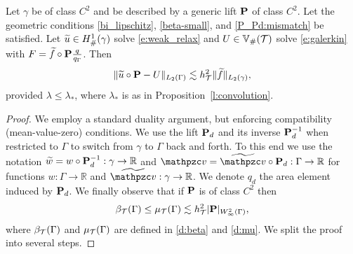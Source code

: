 \begin{theorem}\label{t:L2_apriori}
Let $\gamma$ be of class $C^2$ and be described by a generic lift  ${\bf P}$ of class
$C^2$. Let the geometric conditions \eqref{bi_lipschitz},
\eqref{beta-small}, and \eqref{P_Pd:mismatch} be satisfied.
%
Let $\widetilde{u}\in H^1_\#(\gamma)$ solve \eqref{e:weak_relax} and $U \in \mathbb{V}_\#(\mathcal{T})$ solve
\eqref{e:galerkin} with $F= \widetilde{f} \circ {\bf P} \frac{q}{q_\Gamma}$. Then
%
\begin{equation}\label{e:L2error}
  \| \widetilde{u} \circ {\bf P} - U \|_{L_2 (\Gamma)}
  \lesssim h_{\mathcal{T}}^2  \| \widetilde{f} \|_{L_{2}(\gamma)},
\end{equation}
provided $\lambda \leq \lambda_*$, where $\lambda_*$ is as in Proposition~\ref{l:convolution}.
\end{theorem} 
\begin{proof}
We employ a standard duality argument, but enforcing compatibility (mean-value-zero)
conditions. We use the lift ${\bf P}_d$ and its inverse ${\bf P}_d^{-1}$ when restricted to $\Gamma$ to switch from $\gamma$ to $\Gamma$ back and
forth. To this end we use the notation $\widetilde{w} = w\circ{\bf P}_d^{-1}:\gamma\to\mathbb{R}$
and $\tv = \ttv\circ\bP_d:\Gamma\to\mathbb{R}$ for functions $w:\Gamma\to\mathbb{R}$
and $\ttv:\gamma\to\mathbb{R}$. We denote $q_d$ the area element induced by
${\bf P}_d$. We finally observe that if ${\bf P}$ is of class $C^2$ then
%
\[
\beta_{\mathcal{T}}(\Gamma) \le \mu_{\mathcal{T}}(\Gamma) \lesssim h_{\mathcal{T}}^2 |{\bf P}|_{W^2_\infty(\Gamma)},
\]
%
where $\beta_{\mathcal{T}}(\Gamma)$ and $\mu_{\mathcal{T}}(\Gamma)$ are defined in \eqref{d:beta}
and \eqref{d:mu}. We split the proof into several steps.


\end{proof}
